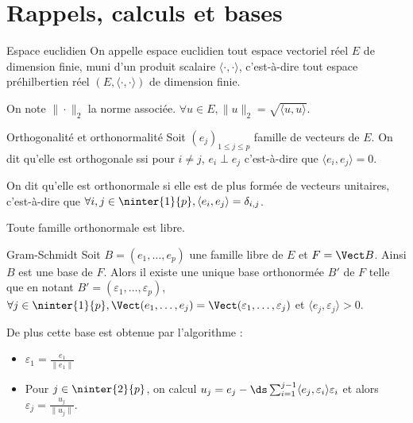 \section{Rappels, calculs et bases}

\begin{definition}{Espace euclidien}{}
    On appelle espace euclidien tout espace vectoriel réel $E$ de dimension finie,
    muni d'un produit scalaire $\langle \cdot, \cdot \rangle$, c'est-à-dire tout espace 
    préhilbertien réel $(E, \langle \cdot, \cdot \rangle)$ de dimension finie.

    On note $\| \cdot \|_2$ la norme associée. $\forall u \in E, \| u \|_2 = \sqrt{\langle u, u \rangle}$.
\end{definition}

\begin{definition}{Orthogonalité et orthonormalité}{}
    Soit $(e_j)_{1 \leqslant j \leqslant p}$ famille de vecteurs de $E$.
    On dit qu'elle est orthogonale ssi pour $i \neq j$, $e_i \perp e_j$ c'est-à-dire 
    que $\langle e_i, e_j \rangle = 0$.

    On dit qu'elle est orthonormale si elle est de plus formée de vecteurs unitaires,
    c'est-à-dire que $\forall i, j \in \ninter{1}{p}, \langle e_i, e_j \rangle = \delta_{i,j}$.

    Toute famille orthonormale est libre. 
\end{definition}

\begin{theoreme}{Gram-Schmidt}{}
    Soit $B = (e_1, \dots, e_p)$ une famille libre de $E$ et $F = \Vect B$. 
    Ainsi $B$ est une base de $F$. Alors il existe une unique base orthonormée 
    $B'$ de $F$ telle que en notant $B' = (\varepsilon_1, \dots, \varepsilon_p)$,
    $\forall j \in \ninter{1}{p}, \Vect(e_1, \dots, e_j) = \Vect(\varepsilon_1, \dots, \varepsilon_j)$
    et $\langle e_j , \varepsilon_j \rangle > 0$.

    De plus cette base est obtenue par l'algorithme : 
    \begin{itemize}
        \item $\varepsilon_1 = \frac{e_1}{\| e_1 \|} $
        \item Pour $j \in \ninter{2}{p}$, on calcul $u_j = e_j - \ds \sum_{i = 1}^{j - 1} \langle e_j, \varepsilon_i \rangle \varepsilon_i$
        et alors $\varepsilon_j = \frac{u_j}{\| u_j \|}$.
    \end{itemize}
\end{theoreme}

